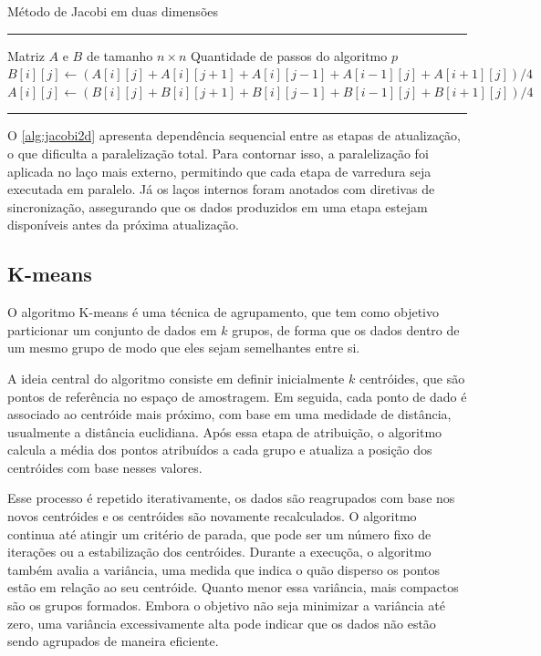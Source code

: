 \begin{algorithm}[htb]
	\caption{Método de Jacobi em duas dimensões}
	\label{alg:jacobi2d}
	\hrule
	\begin{algorithmic}[1]
		\REQUIRE Matriz $A$ e $B$ de tamanho $n \times n$
		\REQUIRE Quantidade de passos do algoritmo $p$
		\STATE $B[i][j] \gets (A[i][j] + A[i][j + 1] + A[i][j - 1] + A[i - 1][j] + A[i + 1][j]) / 4$
		\ENDFOR
		\ENDFOR
		\STATE $A[i][j] \gets (B[i][j] + B[i][j + 1] + B[i][j - 1] + B[i - 1][j] + B[i+1][j]) / 4$
		\ENDFOR
		\ENDFOR
		\ENDFOR
	\end{algorithmic}
	\hrule
	\fonte{}
\end{algorithm}

O \autoref{alg:jacobi2d} apresenta dependência sequencial entre as etapas de atualização, o que dificulta a paralelização total. Para contornar isso, a paralelização foi aplicada no laço mais externo, permitindo que cada etapa de varredura seja executada em paralelo. Já os laços internos foram anotados com diretivas de sincronização, assegurando que os dados produzidos em uma etapa estejam disponíveis antes da próxima atualização.

\subsection{K-means}\label{subsec:kmeans}

O algoritmo K-means é uma técnica de agrupamento, que tem como objetivo particionar um conjunto de dados em $k$ grupos, de forma que os dados dentro de um mesmo grupo de modo que eles sejam semelhantes entre si.

A ideia central do algoritmo consiste em definir inicialmente $k$ centróides, que são pontos de referência no espaço de amostragem. Em seguida, cada ponto de dado é associado ao centróide mais próximo, com base em uma medidade de distância, usualmente a distância euclidiana. Após essa etapa de atribuição, o algoritmo calcula a média dos pontos atribuídos a cada grupo e atualiza a posição dos centróides com base nesses valores.

Esse processo é repetido iterativamente, os dados são reagrupados com base nos novos centróides e os centróides são novamente recalculados. O algoritmo continua até atingir um critério de parada, que pode ser um número fixo de iterações ou a estabilização dos centróides. Durante a execuçõa, o algoritmo também avalia a variância, uma medida que indica o quão disperso os pontos estão em relação ao seu centróide. Quanto menor essa variância, mais compactos são os grupos formados. Embora o objetivo não seja minimizar a variância até zero, uma variância excessivamente alta pode indicar que os dados não estão sendo agrupados de maneira eficiente.

